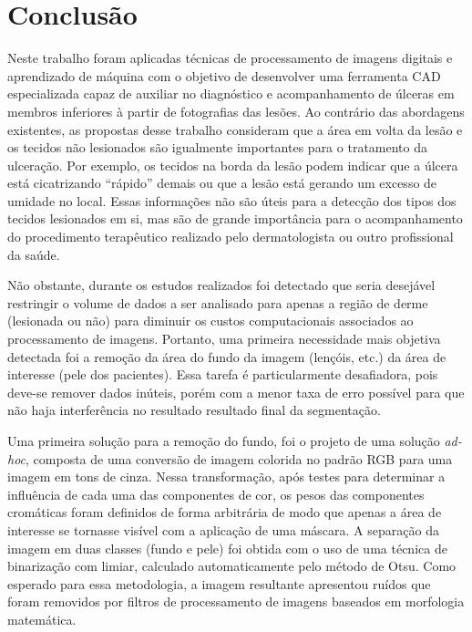\section{Conclusão}\label{sec:conclusion}

Neste trabalho foram  aplicadas técnicas de processamento de imagens digitais e aprendizado de máquina com o objetivo de desenvolver uma ferramenta CAD especializada capaz de auxiliar no diagnóstico e acompanhamento de úlceras em membros inferiores à partir de fotografias das lesões.
Ao contrário das abordagens existentes, as propostas desse trabalho consideram que a área em volta da lesão e os tecidos não lesionados são igualmente importantes para o tratamento da ulceração.
Por exemplo, os tecidos na borda da lesão podem indicar que a úlcera está cicatrizando ``rápido'' demais ou que a lesão está gerando um excesso de umidade no local.
Essas informações não são úteis para a detecção dos tipos dos tecidos lesionados em si, mas são de grande importância para o acompanhamento do procedimento terapêutico realizado pelo dermatologista ou outro profissional da saúde.

Não obstante, durante os estudos realizados foi detectado que seria desejável restringir o volume de dados a ser analisado para apenas a região de derme (lesionada ou não) para diminuir os custos computacionais associados ao processamento de imagens.
Portanto, uma primeira necessidade mais objetiva detectada foi a remoção da área do fundo da imagem (lençóis, etc.) da área de interesse (pele dos pacientes). 
Essa tarefa é particularmente desafiadora, pois deve-se remover dados inúteis, porém com a menor taxa de erro possível para que não haja interferência no resultado resultado final da segmentação.

Uma primeira solução para a remoção do fundo, foi o projeto de uma solução \textit{ad-hoc}, composta de uma conversão de imagem colorida no padrão RGB para uma imagem em tons de cinza. 
Nessa transformação, após testes para determinar a influência de cada uma das componentes de cor, os pesos das componentes cromáticas foram definidos de forma arbitrária de modo que apenas a área de interesse se tornasse visível com a aplicação de uma máscara.
A separação da imagem em duas classes (fundo e pele) foi obtida com o uso de uma técnica de binarização com limiar, calculado automaticamente pelo método de Otsu.
Como esperado para essa metodologia, a imagem resultante apresentou ruídos que foram removidos por filtros de processamento de imagens baseados em morfologia matemática. 


